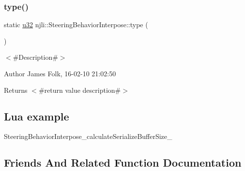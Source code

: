 \mbox{\label{classnjli_1_1_steering_behavior_interpose_ae1701ef534872d5b6bd4170a8460aab8}} 
\subsubsection{\texorpdfstring{type()}{type()}}
{\footnotesize\ttfamily static \mbox{\hyperlink{_util_8h_a10e94b422ef0c20dcdec20d31a1f5049}{u32}} njli\+::\+Steering\+Behavior\+Interpose\+::type (\begin{DoxyParamCaption}{ }\end{DoxyParamCaption})\hspace{0.3cm}{\ttfamily [static]}}



$<$\#\+Description\#$>$ 

\begin{DoxyAuthor}{Author}
James Folk, 16-\/02-\/10 21\+:02\+:50
\end{DoxyAuthor}
\begin{DoxyReturn}{Returns}
$<$\#return value description\#$>$
\end{DoxyReturn}
\hypertarget{classnjli_1_1_steering_behavior_wander_ex1}{}\subsection{Lua example}\label{classnjli_1_1_steering_behavior_wander_ex1}

\begin{DoxyCodeInclude}
\end{DoxyCodeInclude}
Steering\+Behavior\+Interpose\+\_\+calculate\+Serialize\+Buffer\+Size\+\_\+ 

\subsection{Friends And Related Function Documentation}
\mbox{\label{classnjli_1_1_steering_behavior_interpose_acb96ebb09abe8f2a37a915a842babfac}} 
